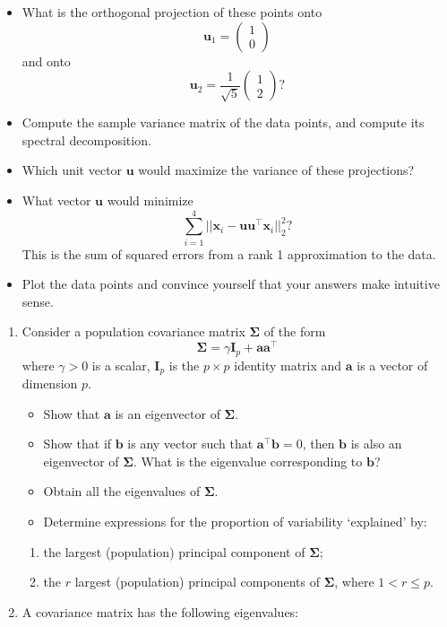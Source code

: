 \documentclass[
]{book}
\providecommand{\tightlist}{%
  \setlength{\itemsep}{0pt}\setlength{\parskip}{0pt}}
\theoremstyle{definition}
\theoremstyle{definition}
\theoremstyle{definition}
\theoremstyle{definition}
\theoremstyle{remark}
\begin{document}
\begin{itemize}
\item
  What is the orthogonal projection of these points onto \[\mathbf u_1 = \begin{pmatrix}1\\0\end{pmatrix}\] and onto \[\mathbf u_2 =\frac{1}{\sqrt{5}}\begin{pmatrix}1\\2\end{pmatrix}?\]
\item
  Compute the sample variance matrix of the data points, and compute its spectral decomposition.
\item
  Which unit vector \(\mathbf u\) would maximize the variance of these projections?
\item
  What vector \(\mathbf u\) would minimize
  \[\sum_{i=1}^4 ||\mathbf x_i -\mathbf u\mathbf u^\top \mathbf x_i||^2_2?\]
  This is the sum of squared errors from a rank 1 approximation to the data.
\item
  Plot the data points and convince yourself that your answers make intuitive sense.
\end{itemize}

\begin{enumerate}
\def\labelenumi{\arabic{enumi}.}
\setcounter{enumi}{1}
\tightlist
\item
  Consider a population covariance matrix \(\boldsymbol{\Sigma}\) of the form
  \[\boldsymbol{\Sigma}=\gamma \mathbf I_p + \mathbf a\mathbf a^\top\]
  where \(\gamma>0\) is a scalar, \(\mathbf I_p\) is the \(p \times p\) identity matrix and \(\mathbf a\) is a vector of dimension \(p\).

  \begin{itemize}
  \tightlist
  \item
    Show that \(\mathbf a\) is an eigenvector of \(\boldsymbol{\Sigma}\).
  \item
    Show that if \(\mathbf b\) is any vector such that \(\mathbf a^\top \mathbf b=0\), then \(\mathbf b\) is also an eigenvector of \(\boldsymbol{\Sigma}\). What is the eigenvalue corresponding to \(\mathbf b\)?
  \item
    Obtain all the eigenvalues of \(\boldsymbol{\Sigma}\).
  \item
    Determine expressions for the proportion of variability `explained' by:
  \end{itemize}

  \begin{enumerate}
  \def\labelenumii{\roman{enumii}.}
  \tightlist
  \item
    the largest (population) principal component of \(\boldsymbol{\Sigma}\);
  \item
    the \(r\) largest (population) principal components of \(\boldsymbol{\Sigma}\), where \(1 < r \leq p\).
  \end{enumerate}
\item
  A covariance matrix has the following eigenvalues:
\end{enumerate}
\end{document}
